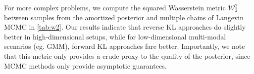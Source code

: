 For more complex problems, we compute the squared Wasserstein metric $\mathcal{W}_2^2$ between samples from the amortized posterior and multiple chains of Langevin MCMC in \cref{tab:w2}. Our results indicate that reverse KL approaches do slightly better in high-dimensional setups, while for low-dimensional multi-modal scenarios (eg. GMM), forward KL approaches fare better. Importantly, we note that this metric only provides a crude proxy to the quality of the posterior, since MCMC methods only provide asymptotic guarantees.

% 

